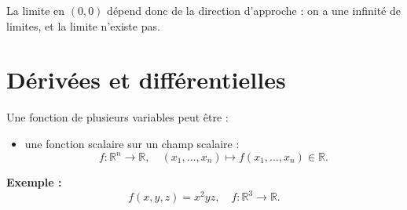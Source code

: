 \documentclass[11pt]{article}
\begin{document}
La limite en $(0,0)$ dépend donc de la direction d’approche :
on a une infinité de limites, et la limite n’existe pas.

\section{Dérivées et différentielles}

Une \og fonction de plusieurs variables \fg{} peut être :

\begin{itemize}
\item une fonction scalaire sur un champ scalaire :
\[
f : \mathbb{R}^n \to \mathbb{R},
\quad (x_1,\ldots,x_n) \mapsto f(x_1,\ldots,x_n) \in \mathbb{R}.
\]
\end{itemize}

\textbf{Exemple :}
\[
f(x,y,z) = x^2yz,
\quad f : \mathbb{R}^3 \to \mathbb{R}.
\]
\end{document}
